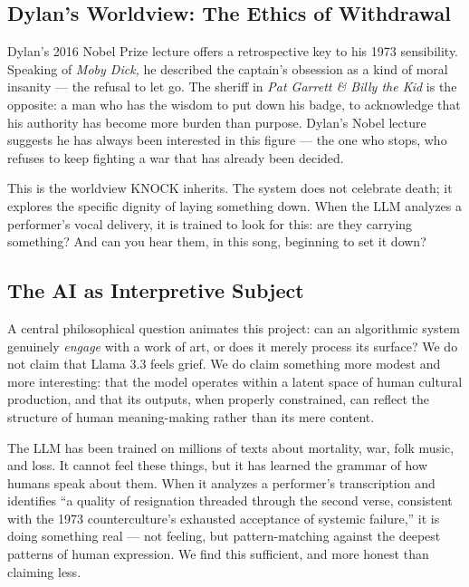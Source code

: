 \documentclass[12pt, a4paper]{article}
\begin{document}
\subsection{Dylan's Worldview: The Ethics of Withdrawal}

Dylan's 2016 Nobel Prize lecture offers a retrospective key to his 1973 sensibility.
Speaking of \textit{Moby Dick,} he described the captain's obsession as a kind of
moral insanity --- the refusal to let go. The sheriff in \textit{Pat Garrett \&
Billy the Kid} is the opposite: a man who has the wisdom to put down his badge,
to acknowledge that his authority has become more burden than purpose. Dylan's Nobel
lecture suggests he has always been interested in this figure --- the one who stops,
who refuses to keep fighting a war that has already been decided.

This is the worldview KNOCK inherits. The system does not celebrate death; it
explores the specific dignity of laying something down. When the LLM analyzes a
performer's vocal delivery, it is trained to look for this: are they carrying
something? And can you hear them, in this song, beginning to set it down?

\subsection{The AI as Interpretive Subject}

A central philosophical question animates this project: can an algorithmic system
genuinely \textit{engage} with a work of art, or does it merely process its surface?
We do not claim that Llama 3.3 feels grief. We do claim something more modest and
more interesting: that the model operates within a latent space of human cultural
production, and that its outputs, when properly constrained, can reflect the
structure of human meaning-making rather than its mere content.

The LLM has been trained on millions of texts about mortality, war, folk music, and
loss. It cannot feel these things, but it has learned the grammar of how humans speak
about them. When it analyzes a performer's transcription and identifies ``a quality
of resignation threaded through the second verse, consistent with the 1973
counterculture's exhausted acceptance of systemic failure,'' it is doing something
real --- not feeling, but pattern-matching against the deepest patterns of human
expression. We find this sufficient, and more honest than claiming less.

\newpage
\end{document}
